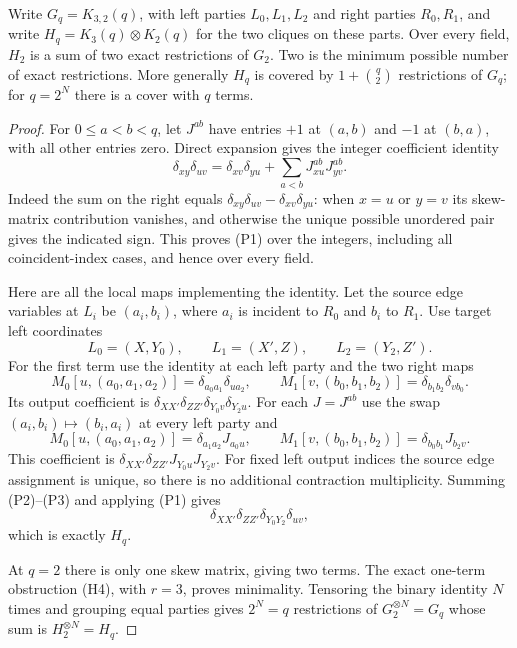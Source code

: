 \begin{proposition}
\label{prop:binary-pentagon-cover}
Write $G_q=K_{3,2}(q)$, with left parties $L_0,L_1,L_2$
and right parties $R_0,R_1$, and write
$H_q=K_3(q)\otimes K_2(q)$ for the two cliques on these
parts.  Over every field, $H_2$ is a sum of two exact
restrictions of $G_2$.  Two is the minimum possible number
of exact restrictions.  More generally $H_q$ is covered
by $1+\binom q2$ restrictions of $G_q$; for $q=2^N$
there is a cover with $q$ terms.
\end{proposition}
\begin{proof}
For $0\le a<b<q$, let $J^{ab}$ have entries $+1$ at
$(a,b)$ and $-1$ at $(b,a)$, with all other entries zero.
Direct expansion gives the integer coefficient identity
\[
 \delta_{xy}\delta_{uv}
 =\delta_{xv}\delta_{yu}
   +\sum_{a<b}J^{ab}_{xu}J^{ab}_{yv}.              \tag{P1}
\]
Indeed the sum on the right equals
$\delta_{xy}\delta_{uv}-\delta_{xv}\delta_{yu}$:
when $x=u$ or $y=v$ its skew-matrix contribution vanishes,
and otherwise the unique possible unordered pair gives
the indicated sign.  This proves (P1) over the integers,
including all coincident-index cases, and hence over
every field.

Here are all the local maps implementing the identity.
Let the source edge variables at $L_i$ be $(a_i,b_i)$,
where $a_i$ is incident to $R_0$ and $b_i$ to $R_1$.
Use target left coordinates
\[
 L_0=(X,Y_0),\qquad L_1=(X',Z),\qquad
 L_2=(Y_2,Z').
\]
For the first term use the identity at each left party
and the two right maps
\[
 M_0[u,(a_0,a_1,a_2)]
       =\delta_{a_0a_1}\delta_{ua_2},\qquad
 M_1[v,(b_0,b_1,b_2)]
       =\delta_{b_1b_2}\delta_{vb_0}.              \tag{P2}
\]
Its output coefficient is
$\delta_{XX'}\delta_{ZZ'}\delta_{Y_0v}\delta_{Y_2u}$.
For each $J=J^{ab}$ use the swap
$(a_i,b_i)\mapsto(b_i,a_i)$ at every left party and
\[
 M_0[u,(a_0,a_1,a_2)]
       =\delta_{a_1a_2}J_{a_0u},\qquad
 M_1[v,(b_0,b_1,b_2)]
       =\delta_{b_0b_1}J_{b_2v}.                \tag{P3}
\]
This coefficient is
$\delta_{XX'}\delta_{ZZ'}J_{Y_0u}J_{Y_2v}$.
For fixed left output indices the source edge assignment
is unique, so there is no additional contraction
multiplicity.  Summing (P2)--(P3) and applying (P1) gives
\[
 \delta_{XX'}\delta_{ZZ'}\delta_{Y_0Y_2}\delta_{uv},
\]
which is exactly $H_q$.

At $q=2$ there is only one skew matrix, giving two
terms.  The exact one-term obstruction (H4), with
$r=3$, proves minimality.  Tensoring the binary identity
$N$ times and grouping equal parties gives $2^N=q$
restrictions of $G_2^{\otimes N}=G_q$ whose sum is
$H_2^{\otimes N}=H_q$.
\end{proof}

